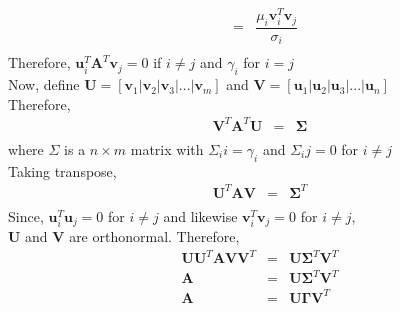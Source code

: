 \documentclass[11pt]{article}
\begin{document}
\begin{enumerate}
\begin{eqnarray*}
&=& \dfrac{\mu_{i} \mathbf{v}_i^T\mathbf{v}_j}{\sigma_{i}} \\
\end{eqnarray*}
Therefore, $\mathbf{u}_i^T \mathbf{A}^T \mathbf{v}_j = 0$ if $i \neq j$ and $\gamma_i$ for  $i = j$\\
Now, define $\mathbf{U} = [\mathbf{v}_1 | \mathbf{v}_2 | \mathbf{v}_3 | ...|\mathbf{v}_m]$ and $\mathbf{V} = [\mathbf{u}_1 | \mathbf{u}_2 | \mathbf{u}_3 | ... |\mathbf{u}_n]$\\
Therefore,
\begin{eqnarray*}
\mathbf{V}^T\mathbf{A}^T\mathbf{U} &=& \mathbf{\Sigma}\\
\end{eqnarray*}
where $\Sigma$ is a $n \times m$ matrix with $\Sigma_ii = \gamma_i$ and $\Sigma_ij = 0$ for 
$i \neq j$ \\
Taking transpose,
\begin{eqnarray*}
\mathbf{U}^T\mathbf{A}\mathbf{V} &=& \mathbf{\Sigma}^T\\
\end{eqnarray*}
Since, $\mathbf{u}^T_i \mathbf{u}_j = 0$ for $i \neq j$ and likewise $\mathbf{v}^T_i \mathbf{v}_j = 0$ for $i \neq j$, \\
$\mathbf{U}$ and $\mathbf{V}$ are orthonormal.
Therefore,
\begin{eqnarray*}
\mathbf{UU}^T\mathbf{A}\mathbf{VV}^T &=& \mathbf{U\Sigma}^T\mathbf{V}^T\\
\mathbf{A} &=& \mathbf{U\Sigma}^T\mathbf{V}^T\\
\mathbf{A} &=& \mathbf{U\Gamma}\mathbf{V}^T\\
\end{eqnarray*}
\end{enumerate}
\end{document}
